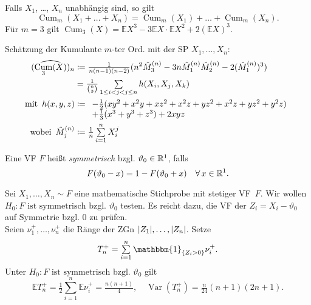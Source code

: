 \documentclass{cheat-sheet}
\newcommand{\E}{\mathbb{E}} %
\newcommand{\ind}{\mathbbm{1}} %
\DeclareMathOperator{\Cum}{Cum} %
\DeclareMathOperator{\var}{Var} %
\newcommand{\testh}[1]{\textcolor{TestColor}{\textbf{#1}}}
\begin{document}
\begin{bem}
  Falls $X_1$, \ldots, $X_n$ unabhängig sind, so gilt
  \[ \Cum_m(X_1 + \ldots + X_n) = \Cum_m(X_1) + \ldots + \Cum_m(X_n). \]
  Für $m=3$ gilt $\Cum_3(X) = \E X^3 - 3 \E X \cdot \E X^2 + 2 (\E X)^3$.
\end{bem}

\begin{bsp}
  Schätzung der Kumulante $m$-ter Ord. mit der SP $X_1, \ldots, X_n$:
  \begin{align*}
    (\widehat{\Cum_3(X)})_n & \coloneqq \tfrac{1}{n (n-1) (n-2)} (n^2 \hat{M}_3^{(n)} - 3 n \hat{M}_1^{(n)} \hat{M}_2^{(n)} - 2 (\hat{M}_1^{(n)})^3) \\
    & = \tfrac{1}{\binom{n}{3}} \sum_{1 \leq i < j < j \leq n} h(X_i, X_j, X_k) \\
    \text{mit} \enspace
    h(x, y, z) & \coloneqq \begin{array}[t]{l}
      - \tfrac{1}{2} (xy^2 + x^2 y + x z^2 + x^2 z + y z^2 + x^2 z + y z^2 + y^2 z) \\
      + \tfrac{1}{3} (x^3 + y^3 + z^3) + 2 xyz
    \end{array} \\
    \enspace \text{wobei} \enspace
    \hat{M}_j^{(n)} & \coloneqq \tfrac{1}{n} \sum_{i=1}^n X_i^j
  \end{align*}
\end{bsp}

\begin{defn}
  Eine VF $F$ heißt \emph{symmetrisch} bzgl. $\vartheta_0 \in \mathbb{R}^1$, falls
  \[
    F(\vartheta_0 - x) = 1 - F(\vartheta_0 + x) \quad
    \forall \, x \in \mathbb{R}^1.
  \]
\end{defn}

\begin{bsp}
  Sei $X_1, \ldots, X_n \sim F$ eine mathematische Stichprobe mit stetiger VF~$F$.
  Wir wollen \testh{$H_0 : \text{$F$ ist symmetrisch bzgl. $\vartheta_0$}$} testen.
  Es reicht dazu, die VF der $Z_i = X_i - \vartheta_0$ auf Symmetrie bzgl. $0$ zu prüfen. \\
  Seien $\nu_1^{+}, \ldots, \nu_n^{+}$ die Ränge der ZGn $\lvert Z_1\rvert, \ldots, \lvert Z_n\rvert$.
  Setze
  \[ T_n^{+} = \sum_{i=1}^n \ind_{\{ Z_i > 0 \}} \nu_i^{+}. \]
  Unter $H_0 : \text{$F$ ist symmetrisch bzgl. $\vartheta_0$}$ gilt
  \[
    \E T_n^{+} = \tfrac{1}{2} \sum_{i=1}^n \E \nu_i^{+} = \tfrac{n (n+1)}{4}, \quad
    \var(T_n^{+}) = \tfrac{n}{24} (n + 1) (2n + 1).
  \]
\end{bsp}
\end{document}
